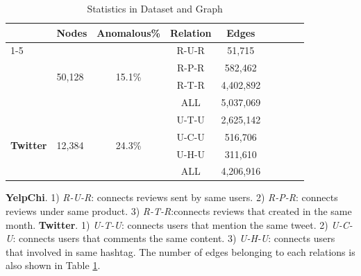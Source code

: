\documentclass[conference]{IEEEtran}
\theoremstyle{definition}
\begin{document}
\renewcommand\arraystretch{1.5}
\begin{table}[htbp]
\caption{Statistics in Dataset and Graph}
\label{table:stc}
\centering
\begin{tabular}{llcccllll}
\toprule
                                                       & \multicolumn{1}{c}{\textbf{Nodes}} & \textbf{Anomalous\%}    & \textbf{Relation}    & \textbf{Edges}  \\ \cline{1-5}
\multicolumn{1}{c|}{\multirow{4}{*}{\textbf{YelpChi}}} & \multirow{4}{*}{50,128}            & \multirow{4}{*}{15.1\%} & R-U-R                & 51,715        \\
\multicolumn{1}{c|}{}                                  &                                    &                         & R-P-R                & 582,462          \\
\multicolumn{1}{c|}{}                                  &                                    &                         & R-T-R                & 4,402,892       \\
\multicolumn{1}{c|}{}                                  &                                    &                         & ALL                  & 5,037,069        \\ \midrule
\multicolumn{1}{l|}{\multirow{4}{*}{\textbf{Twitter}}} & \multirow{4}{*}{12,384}            & \multirow{4}{*}{24.3\%} & U-T-U                & 2,625,142       \\
\multicolumn{1}{l|}{}                                  &                                    &                         & U-C-U                & 516,706  \\
\multicolumn{1}{l|}{}                                  &                                    &                         & U-H-U                & 311,610      \\
\multicolumn{1}{l|}{}                                  &                                    &                         & ALL                  & 4,206,916    \\ \bottomrule
\end{tabular}
\end{table}
\textbf{YelpChi}.
1) \textit{R-U-R}: connects reviews sent by same users.
2) \textit{R-P-R}: connects reviews under same product.
3) \textit{R-T-R}:connects reviews that created in the same month.
\textbf{Twitter}.
1) \textit{U-T-U}: connects users that mention the same tweet.
2) \textit{U-C-U}: connects users that comments the same content.
3) \textit{U-H-U}: connects users that involved in same hashtag.
The number of edges belonging to each relations is also shown in Table \ref{table:stc}.
\end{document}
